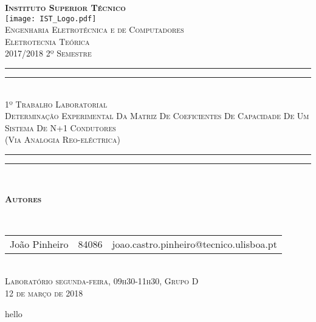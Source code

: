 \documentclass[a4paper, titlepage, portuguese]{article}
\begin{document}
\begin{titlepage}
	\center
	\textsc{\bfseries\LARGE Instituto Superior Técnico}\\[1cm] %
	\texttt{[image: IST\_Logo.pdf]}\\[2.5cm]

	\textsc{\Large Engenharia Eletrotécnica e de Computadores}\\[0.5cm] %
	\textsc{\Large Eletrotecnia Teórica}\\[0.5cm] %
	\textsc{\large 2017/2018 2º Semestre}\\[2cm]

	\rule{\textwidth}{1.6pt}\vspace*{-\baselineskip}\vspace*{2pt} %
	\rule{\textwidth}{0.4pt}\\[\baselineskip] %
		\textsc{\Huge 1º Trabalho Laboratorial}\\[0.2cm]
		\bigskip
		\textsc{\large Determinação Experimental Da Matriz De Coeficientes De Capacidade De Um Sistema De N+1 Condutores \\
		(Via Analogia Reo-eléctrica)}\\[0.2cm]
	\rule{\textwidth}{0.4pt}\vspace*{-\baselineskip}\vspace{3.2pt} %
	\rule{\textwidth}{1.6pt}\\[6cm]

	\begin{minipage}{0.9\textwidth}
		\begin{flushleft} \large
			\begin{Large}\bfseries\textsc{Autores}\end{Large}\\[0.4cm]
			\begin{tabular}{l l l}
				João Pinheiro				& 84086 & \normalsize joao.castro.pinheiro@tecnico.ulisboa.pt \\
			\end{tabular}
		\end{flushleft}
	\end{minipage}\\[0.5cm]

	\large \textsc{Laboratório segunda-feira, 09h30-11h30, Grupo D\\
	\large 12 de março de 2018}\\[1cm]
	\setcounter{page}{0}
\end{titlepage}

hello



\end{document}
